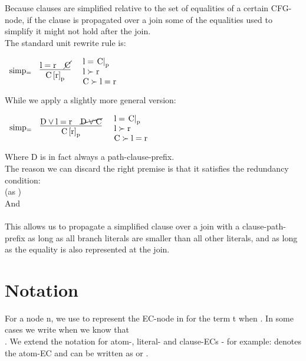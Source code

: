 Because clauses are simplified relative to the set of equalities of a certain CFG-node, if the clause is propagated over a join some of the equalities used to simplify it might not hold after the join.\\
The standard unit rewrite rule is:

\bigskip

$
\begin{array}[c]{llll}
\m{simp_{=}} & \vcenter{\infer[]{\m{\termRepAt{C}{r}{p}}}{\m{l=r} & \cancel{\m{C}}}}   &
\parbox[c][1.2cm]{3cm}{\m{l=\termAt{C}{p}}\\\m{l \succ r}\\\m{C \succ l=r}}\\
\end{array}
$

\bigskip

\noindent
While we apply a slightly more general version:

\bigskip

$
\begin{array}[c]{llll}
\m{simp_{=}} & \vcenter{\infer[]{\m{\termRepAt{C}{r}{p}}}{\m{D \lor l=r} & \cancel{\m{D \lor C}}}}   &
\parbox[c][1.2cm]{3cm}{\m{l=\termAt{C}{p}}\\\m{l \succ r}\\\m{C \succ l=r}}\\
\end{array}
$

\bigskip

\noindent
Where D is in fact always a path-clause-prefix.\\
The reason we can discard the right premise is that it satisfies the redundancy condition:\\
 (as )\\
And\\
\\
This allows us to propagate a simplified clause over a join with a clause-path-prefix as long as all branch literals are smaller than all other literals, and as long as the equality is also represented at the join.


\section*{Notation}
For a node n, we use  to represent the EC-node in  for the term t when .
In some cases we write  when we know that \\
.
We extend the notation for atom-, literal- and clause-ECs - for example:
 denotes the atom-EC  and 
 can be written as  or .


